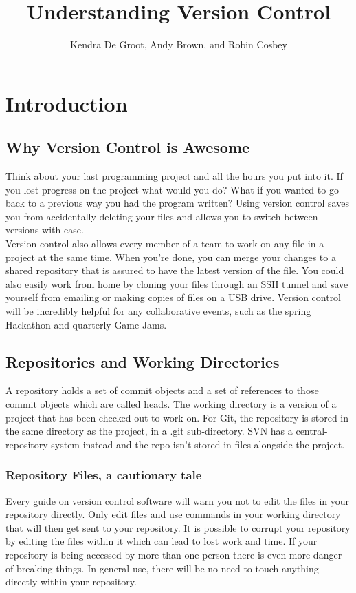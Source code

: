 \documentclass[oneside]{book}
\begin{document}
\title{Understanding Version Control}
\author{Kendra De Groot, Andy Brown, and Robin Cosbey}

\maketitle
\tableofcontents
\newpage
\chapter{Introduction}
\section{Why Version Control is Awesome}
Think about your last programming project and all the hours you put into it. If you lost progress on the project what would you do? What if you wanted to go back to a previous way you had the program written? Using version control saves you from accidentally deleting your files and allows you to switch between versions with ease.\\

Version control also allows every member of a team to work on any file in a project at the same time. When you're done, you can merge your changes to a shared repository that is assured to have the latest version of the file. You could also easily work from home by cloning your files through an SSH tunnel and save yourself from emailing or making copies of files on a USB drive. Version control will be incredibly helpful for any collaborative events, such as the spring Hackathon and quarterly Game Jams.

\section{Repositories and Working Directories}
A repository holds a set of commit objects and a set of references to those commit objects which are called heads.
The working directory is a version of a project that has been checked out to work on.
For Git, the repository is stored in the same directory as the project, in a .git sub-directory. SVN has a central-repository system instead and the repo isn't stored in files alongside the project.
\subsection{Repository Files, a cautionary tale}
Every guide on version control software will warn you not to edit the files in your repository directly. Only edit files and use commands in your working directory that will then get sent to your repository. It is possible to corrupt your repository by editing the files within it which can lead to lost work and time. If your repository is being accessed by more than one person there is even more danger of breaking things. In general use, there will be no need to touch anything directly within your repository. 
\\
\\
\end{document}
